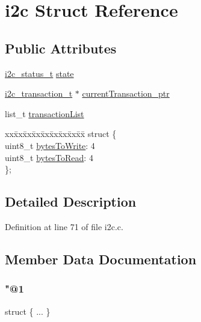 \hypertarget{structi2c}{}\section{i2c Struct Reference}
\label{structi2c}
\subsection*{Public Attributes}
\begin{DoxyCompactItemize}
\item 
\mbox{\hyperlink{i2c_8c_ada1e8e589688e2d6626421d8d85d9c53}{i2c\+\_\+status\+\_\+t}} \mbox{\hyperlink{structi2c_a34d072b4e51269fe40e4ebe4e5de01ee}{state}}
\item 
\mbox{\hyperlink{i2c_8h_a8b9b6c6a900b8e4a9ca7c41f6cf1d6fa}{i2c\+\_\+transaction\+\_\+t}} $\ast$ \mbox{\hyperlink{structi2c_afca76c325a94a33dc4bb4e6a28b35fcf}{current\+Transaction\+\_\+ptr}}
\item 
list\+\_\+t \mbox{\hyperlink{structi2c_a0b6b540801803c2a7147c38f7c5d47d3}{transaction\+List}}
\item 
\begin{tabbing}
xx\=xx\=xx\=xx\=xx\=xx\=xx\=xx\=xx\=\kill
struct \{\\
\>uint8\_t \mbox{\hyperlink{structi2c_a4202aea4cdb53f01f8cef8562d4f2d65}{bytesToWrite}}: 4\\
\>uint8\_t \mbox{\hyperlink{structi2c_aa54fb1d1cfe0f585428f67a2f89be938}{bytesToRead}}: 4\\
\}; \\

\end{tabbing}\end{DoxyCompactItemize}


\subsection{Detailed Description}


Definition at line 71 of file i2c.\+c.



\subsection{Member Data Documentation}
\mbox{\label{structi2c_a83ccb69cd9a68b3c4f3653dce4a687d8}} 
\subsubsection{\texorpdfstring{"@1}{@1}}
{\footnotesize\ttfamily struct \{ ... \} }

